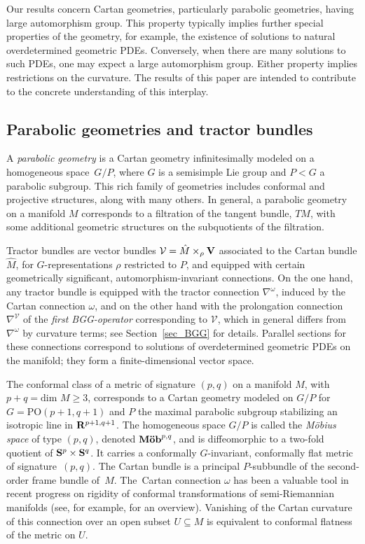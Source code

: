 \documentclass[pdftex]{sigma}
\numberwithin{equation}{section}
\theoremstyle{definition}
\newcommand{\BR}{{\bf R}}
\begin{document}
Our results concern Cartan geometries, particularly parabolic geometries, having large
automorphism group. This property typically implies further special properties of the geometry, for example,
the existence of solutions to natural overdetermined geometric PDEs. Conversely,
when there are many solutions to such PDEs, one may expect a large automorphism group. Either property implies restrictions on the curvature. The results of this paper are intended to contribute to the concrete understanding of this interplay.

\subsection{Parabolic geometries and tractor bundles}
\label{sec.intro.tractor}

A \emph{parabolic geometry} is a Cartan geometry infinitesimally modeled
on a homogeneous space~$G/P$, where $G$ is a semisimple Lie group and
$P < G$ a parabolic subgroup. This rich family of geometries includes
conformal and projective structures, along with many others. In general, a parabolic
geometry on a manifold $M$ corresponds to a filtration of the tangent
bundle, $TM$, with some additional geometric structures on the
subquotients of the filtration.

Tractor bundles are vector bundles {$\mathcal{V} = \hat{M} \times_\rho {\bf V}$} associated to the Cartan bundle
$\hat{M}$, for $G$-representations $\rho$ restricted to $P$, and equipped
with certain geometrically significant, automorphism-invariant connections.
On the one hand, any tractor bundle is equipped with the tractor connection $\nabla^\omega$, induced by the Cartan connection $\omega$,
and on the other hand with the prolongation connection $\nabla^{\mathcal V}$ of the \emph{first BGG-operator} corresponding to $\mathcal V$, which
in general differs from $\nabla^\omega$ by curvature terms; see Section~\ref{sec_BGG} for details. Parallel sections for these connections correspond to solutions of overdetermined
geometric PDEs
on the manifold; they form a finite-dimensional vector space.

The conformal class of a metric of signature $(p,q)$ on a manifold
$M$, with $p+q = \mbox{dim } M \geq 3$, corresponds to a Cartan geometry
modeled on $G/P$ for $G = \mbox{PO}(p+1,q+1)$ and $P$ the maximal
parabolic subgroup stabilizing an isotropic line in $\BR^{p+1,q+1}$.
The homogeneous space $G/P$ is called the \emph{M\"obius space} of
type $(p,q)$, denoted $\mbox{\bf M\"ob}^{p,q}$, and is diffeomorphic to a two-fold quotient of ${\bf S}^p \times {\bf S}^q$. It carries a
conformally $G$-invariant, conformally flat metric of signature~$(p,q)$. The Cartan
bundle is a principal $P$-subbundle of the second-order frame bundle
of~$M$. The~Cartan connection $\omega$ has been a valuable tool
in recent progress on rigidity of conformal transformations of
semi-Riemannian manifolds (see, for example, \cite{me.notices} for an
overview). Vanishing of the Cartan curvature of this connection over an
open subset $U \subseteq M$ is equivalent to conformal flatness of the
metric on $U$.
\end{document}

